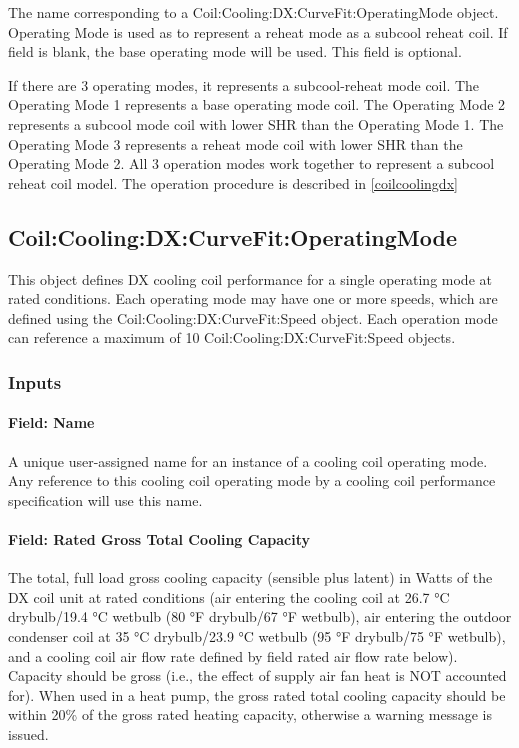 The name corresponding to a Coil:Cooling:DX:CurveFit:OperatingMode object. Operating Mode is used as to represent a reheat mode as a subcool reheat coil. If field is blank, the base operating mode will be used. This field is optional.

If there are 3 operating modes, it represents a subcool-reheat mode coil. The Operating Mode 1 represents a base operating mode coil. The Operating Mode 2 represents a subcool mode coil with lower SHR than the Operating Mode 1. The Operating Mode 3 represents a reheat mode coil with lower SHR than the Operating Mode 2. All 3 operation modes work together to represent a subcool reheat coil model. The operation procedure is described in \ref{coilcoolingdx}  

\subsection{Coil:Cooling:DX:CurveFit:OperatingMode}\label{coilcoolingdxcurvefitoperatingmode}

This object defines DX cooling coil performance for a single operating mode at rated conditions. Each operating mode may have one or more speeds, which are defined using the Coil:Cooling:DX:CurveFit:Speed object. Each operation mode can reference a maximum of 10 Coil:Cooling:DX:CurveFit:Speed objects.

\subsubsection{Inputs}\label{inputs-03}

\paragraph{Field: Name}\label{field-name-03}

A unique user-assigned name for an instance of a cooling coil operating mode. Any reference to this cooling coil operating mode by a cooling coil performance specification will use this name.

\paragraph{Field: Rated Gross Total Cooling Capacity}\label{field-rated-gross-total-cooling-capacity-1}

The total, full load gross cooling capacity (sensible plus latent) in Watts of the DX coil unit at rated conditions (air entering the cooling coil at 26.7 °C drybulb/19.4 °C wetbulb (80 °F drybulb/67 °F wetbulb), air entering the outdoor condenser coil at 35 °C drybulb/23.9 °C wetbulb (95 °F drybulb/75 °F wetbulb), and a cooling coil air flow rate defined by field rated air flow rate below). Capacity should be gross (i.e., the effect of supply air fan heat is NOT accounted for). When used in a heat pump, the gross rated total cooling capacity should be within 20\% of the gross rated heating capacity, otherwise a warning message is issued.

